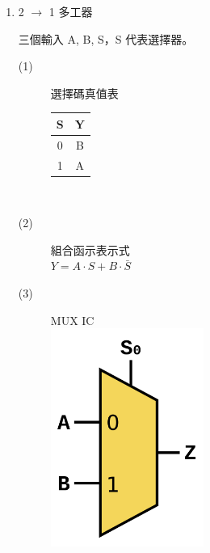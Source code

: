 \documentclass[12pt, a4paper]{article}
\begin{document}
\begin{description}
\begin{enumerate}
\begin{description}
              \normalsize
            \end{description}
            \item 2 $\rightarrow$ 1 多工器\\
              \fontsize{16pt}{20pt}\selectfont
              \begin{samepage}              
                三個輸入 A, B, S，S 代表選擇器。\\[.8cm]
              \end{samepage}
              \begin{description}
                  \item [(1)] 選擇碼真值表
                    \begin{table}[h]
                      \centering
                      \label{tab:sample}
                      \begin{adjustbox}{width=.15\textwidth}
                      \begin{tabular}{ |c|c| }
                        \hline
                        S & Y \\
                        \hline
                        0 & B \\
                        \hline
                        1 & A \\
                        \hline
                      \end{tabular}
                      \end{adjustbox}
                      \end{table} \\
                  \item [(2)] 組合函示表示式\\ 
                      $Y = A\cdot S + B\cdot \bar S$
                  \item [(3)] MUX IC \\
                      \includegraphics[width=5cm]{./image/Multiplexer_2-to-1.svg.png}
              \end{description}
              

\end{enumerate}
\end{description}
\end{document}
